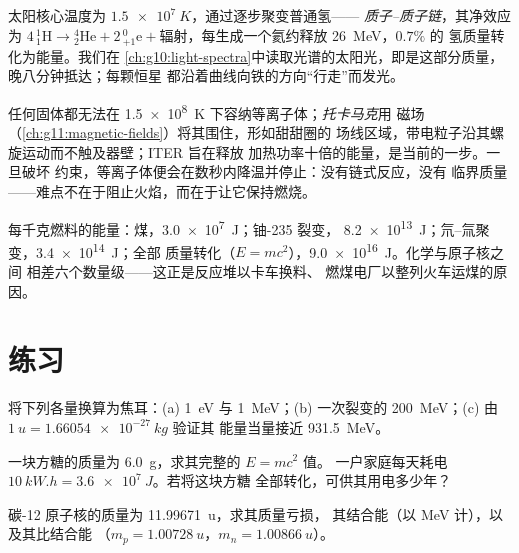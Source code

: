 \begin{example}[太阳靠它发光]\label{ex:g12:nuclear-energy:sun}
太阳核心温度为 $\qty{1.5e7}{K}$，通过逐步聚变普通氢——
\emph{质子–质子链}，其净效应为
$4\,{}^{1}_{1}\mathrm{H} \to {}^{4}_{2}\mathrm{He} + 2\,{}^{0}_{+1}\mathrm{e}
+ \text{辐射}$，每生成一个氦约释放 \qty{26}{MeV}，$0.7\%$ 的
氢质量转化为能量。我们在
\cref{ch:g10:light-spectra}中读取光谱的太阳光，即是这部分质量，晚八分钟抵达；每颗恒星
都沿着曲线向铁的方向“行走”而发光。
\end{example}

\begin{remark}\label{rem:g12:nuclear-energy:iter}
任何固体都无法在 \qty{1.5e8}{K} 下容纳等离子体；\emph{托卡马克}用
磁场（\cref{ch:g11:magnetic-fields}）将其围住，形如甜甜圈的
场线区域，带电粒子沿其螺旋运动而不触及器壁；ITER 旨在释放
加热功率十倍的能量，是当前的一步。一旦破坏
约束，等离子体便会在数秒内降温并停止：没有链式反应，没有
临界质量——难点不在于阻止火焰，而在于让它保持燃烧。
\end{remark}

\begin{example}[每千克的能量阶梯]\label{ex:g12:nuclear-energy:ladder}
每千克燃料的能量：煤，\qty{3.0e7}{J}；铀-235 裂变，
\qty{8.2e13}{J}；氘–氚聚变，\qty{3.4e14}{J}；全部
质量转化（$E = mc^2$），\qty{9.0e16}{J}。化学与原子核之间
相差六个数量级——这正是反应堆以卡车换料、
燃煤电厂以整列火车运煤的原因。
\end{example}

\section{练习}

\begin{exercise}[$\star$]\label{exo:g12:nuclear-energy:1}
将下列各量换算为焦耳：(a) \qty{1}{eV} 与 \qty{1}{MeV}；(b) 一次裂变的
\qty{200}{MeV}；(c) 由 $\qty{1}{u} = \qty{1.66054e-27}{kg}$ 验证其
能量当量接近 \qty{931.5}{MeV}。
\end{exercise}

\begin{exercise}[$\star$]\label{exo:g12:nuclear-energy:2}
一块方糖的质量为 \qty{6.0}{g}，求其完整的 $E = mc^2$ 值。
一户家庭每天耗电 $\qty{10}{kW.h} = \qty{3.6e7}{J}$。若将这块方糖
全部转化，可供其用电多少年？
\end{exercise}

\begin{exercise}[$\star$]\label{exo:g12:nuclear-energy:3}
碳-12 原子核的质量为 \qty{11.99671}{u}，求其质量亏损，
其结合能（以 \unit{MeV} 计），以及其比结合能
（$m_p = \qty{1.00728}{u}$，$m_n = \qty{1.00866}{u}$）。
\end{exercise}

